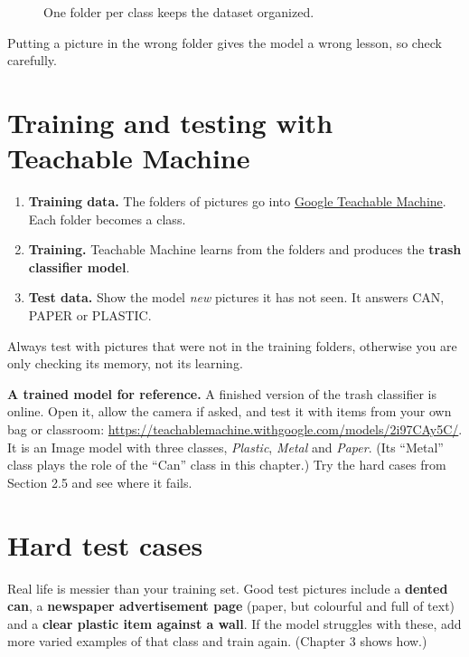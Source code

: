 \begin{figure}[htbp]
\centering
{}
\caption{One folder per class keeps the dataset organized.}\label{fig:folder-structure}
\end{figure}

Putting a picture in the wrong folder gives the model a wrong lesson, so check carefully.


\section{Training and testing with Teachable Machine}

\begin{enumerate}
\item \textbf{Training data.} The folders of pictures go into \href{https://teachablemachine.withgoogle.com}{Google Teachable Machine}. Each folder becomes a class.
\item \textbf{Training.} Teachable Machine learns from the folders and produces the \textbf{trash classifier model}.
\item \textbf{Test data.} Show the model \emph{new} pictures it has not seen. It answers CAN, PAPER or PLASTIC.
\end{enumerate}

Always test with pictures that were not in the training folders, otherwise you are only checking its memory, not its learning.


\textbf{A trained model for reference.} A finished version of the trash classifier is online. Open it, allow the camera if asked, and test it with items from your own bag or classroom: \href{https://teachablemachine.withgoogle.com/models/2i97CAy5C/}{https://teachablemachine.withgoogle.com/models/2i97CAy5C/}. It is an Image model with three classes, \emph{Plastic}, \emph{Metal} and \emph{Paper}. (Its “Metal” class plays the role of the “Can” class in this chapter.) Try the hard cases from Section 2.5 and see where it fails.


\section{Hard test cases}

Real life is messier than your training set. Good test pictures include a \textbf{dented can}, a \textbf{newspaper advertisement page} (paper, but colourful and full of text) and a \textbf{clear plastic item against a wall}. If the model struggles with these, add more varied examples of that class and train again. (Chapter 3 shows how.)


